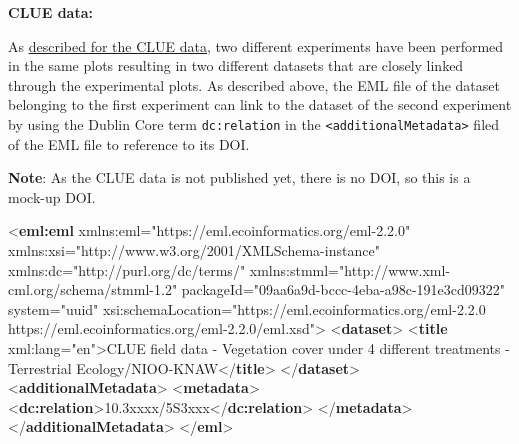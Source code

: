 \documentclass[
]{book}
\newenvironment{Shaded}{\begin{snugshade}}{\end{snugshade}}
\newcommand{\KeywordTok}[1]{\textcolor[rgb]{0.13,0.29,0.53}{\textbf{#1}}}
\newcommand{\NormalTok}[1]{#1}
\newcommand{\OtherTok}[1]{\textcolor[rgb]{0.56,0.35,0.01}{#1}}
\newcommand{\StringTok}[1]{\textcolor[rgb]{0.31,0.60,0.02}{#1}}
\begin{document}
\textbf{CLUE data:}

As \protect\hyperlink{CLUE}{described for the CLUE data}, two different experiments have been performed in the same plots resulting in two different datasets that are closely linked through the experimental plots. As described above, the EML file of the dataset belonging to the first experiment can link to the dataset of the second experiment by using the Dublin Core term \texttt{dc:relation} in the \texttt{\textless{}additionalMetadata\textgreater{}} filed of the EML file to reference to its DOI.

\textbf{Note}: As the CLUE data is not published yet, there is no DOI, so this is a mock-up DOI.

\begin{Shaded}
\begin{Highlighting}[]
\NormalTok{\textless{}}\KeywordTok{eml:eml}\OtherTok{ xmlns:eml=}\StringTok{"https://eml.ecoinformatics.org/eml{-}2.2.0"}
\OtherTok{         xmlns:xsi=}\StringTok{"http://www.w3.org/2001/XMLSchema{-}instance"}
\OtherTok{         xmlns:dc=}\StringTok{"http://purl.org/dc/terms/"}
\OtherTok{         xmlns:stmml=}\StringTok{"http://www.xml{-}cml.org/schema/stmml{-}1.2"}
\OtherTok{         packageId=}\StringTok{"09aa6a9d{-}bccc{-}4eba{-}a98c{-}191e3cd09322"}\OtherTok{ system=}\StringTok{"uuid"}
\OtherTok{         xsi:schemaLocation=}\StringTok{"https://eml.ecoinformatics.org/eml{-}2.2.0 https://eml.ecoinformatics.org/eml{-}2.2.0/eml.xsd"}\NormalTok{\textgreater{}}
\NormalTok{  \textless{}}\KeywordTok{dataset}\NormalTok{\textgreater{}}
\NormalTok{    \textless{}}\KeywordTok{title}\OtherTok{ xml:lang=}\StringTok{"en"}\NormalTok{\textgreater{}CLUE field data {-} Vegetation cover under 4 different treatments {-} Terrestrial Ecology/NIOO{-}KNAW\textless{}/}\KeywordTok{title}\NormalTok{\textgreater{}}
\NormalTok{  \textless{}/}\KeywordTok{dataset}\NormalTok{\textgreater{}}
\NormalTok{  \textless{}}\KeywordTok{additionalMetadata}\NormalTok{\textgreater{}}
\NormalTok{    \textless{}}\KeywordTok{metadata}\NormalTok{\textgreater{}}
\NormalTok{      \textless{}}\KeywordTok{dc:relation}\NormalTok{\textgreater{}10.3xxxx/5S3xxx\textless{}/}\KeywordTok{dc:relation}\NormalTok{\textgreater{}}
\NormalTok{    \textless{}/}\KeywordTok{metadata}\NormalTok{\textgreater{}}
\NormalTok{  \textless{}/}\KeywordTok{additionalMetadata}\NormalTok{\textgreater{}}
\NormalTok{\textless{}/}\KeywordTok{eml}\NormalTok{\textgreater{}}
\end{Highlighting}
\end{Shaded}
\end{document}
